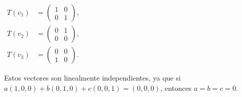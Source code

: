 \begin{enumerate}
    $
    \begin{aligned}
        T(v_1) &= \left(
                                            \begin{array}{cc}
                                                1 & 0 \\
                                                0 & 1
                                            \end{array}
                                        \right), \\
        T(v_2) &= \left(
                                            \begin{array}{cc}
                                                0 & 1 \\
                                                0 & 0
                                            \end{array}
                                        \right), \\
        T(v_3) &= \left(
                                            \begin{array}{cc}
                                                0 & 0 \\
                                                1 & 0
                                            \end{array}
                                        \right).
    \end{aligned}
    $
        
    Estos vectores son linealmente independientes, ya que si $a(1,0,0) + b(0,1,0) + c(0,0,1) = (0,0,0)$,
    entonces $a = b = c = 0$.    

\end{enumerate}